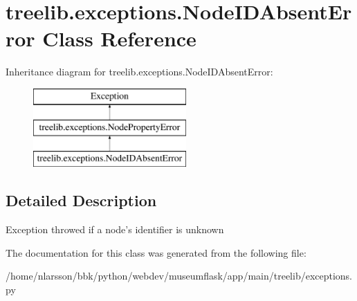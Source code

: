 \hypertarget{classtreelib_1_1exceptions_1_1NodeIDAbsentError}{}\section{treelib.\+exceptions.\+Node\+I\+D\+Absent\+Error Class Reference}
\label{classtreelib_1_1exceptions_1_1NodeIDAbsentError}
Inheritance diagram for treelib.\+exceptions.\+Node\+I\+D\+Absent\+Error\+:\begin{figure}[H]
\begin{center}
\leavevmode
\includegraphics[height=3.000000cm]{classtreelib_1_1exceptions_1_1NodeIDAbsentError}
\end{center}
\end{figure}


\subsection{Detailed Description}
\begin{DoxyVerb}Exception throwed if a node's identifier is unknown\end{DoxyVerb}
 

The documentation for this class was generated from the following file\+:\begin{DoxyCompactItemize}
\item 
/home/nlarsson/bbk/python/webdev/museumflask/app/main/treelib/exceptions.\+py\end{DoxyCompactItemize}
